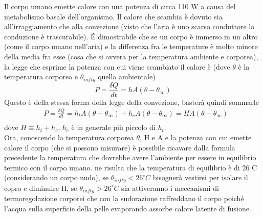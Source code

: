 \documentclass[
10pt, %
a4paper, %
oneside, %
headinclude,footinclude, %
BCOR5mm, %
]{scrartcl}
\begin{document}
\begin{exercise}
	Il corpo umano emette calore con una potenza di circa 110 W a causa del metabolismo basale dell'organismo. Il calore che scambia è dovuto sia all'irraggiamento che alla convezione (visto che l'aria è uno scarso conduttore la conduzione è trascurabile). \'{E} dimostrabile che se un corpo è immerso in un altro (come il corpo umano nell'aria) e la differenza fra le temperature è molto minore della media fra esse (cosa che si avvera per la temperatura ambiente e corporea), la legge che esprime la potenza con cui viene scambiato il calore è (dove $\theta$ è la temperatura corporea e $\theta_{infty}$ quella ambientale)
	\[P  = \frac{\delta Q}{dt} = h A (\theta - \theta_{\infty})\]
	Questo è della stessa forma della legge della convezione, basterà quindi sommarle
	\begin{align*}
		&P  = \frac{\delta Q}{dt} = h_t A (\theta - \theta_{\infty}) + h_c A (\theta - \theta_{\infty}) = H A (\theta - \theta_{\infty})\\
	\end{align*}
	dove $H \equiv h_t + h_c$, $h_c$ è in generale più piccolo di $h_t$.\\
	Ora, conoscendo la temperatura corporea $\theta$, H e A e la potenza con cui emette calore il corpo (che si possono misurare) è possibile ricavare dalla formula precedente la temperatura che dovrebbe avere l'ambiente per essere in equilibrio termico con il corpo umano. ne risulta che la temperatura di equilibrio è di 26 \textdegree C (considerando un corpo nudo), se $\theta_{infty} < 26 ^\circ C $ bisognerà vestirsi per isolare il copro e diminuire H, se $\theta_{infty} > 26 ^\circ C $ sia attiveranno i meccanismi di termoregolazione corporei che con la sudorazione raffreddano il corpo poiché l'acqua sulla superficie della pelle evaporando assorbe calore latente di fusione. 
\end{exercise}
\end{document}
